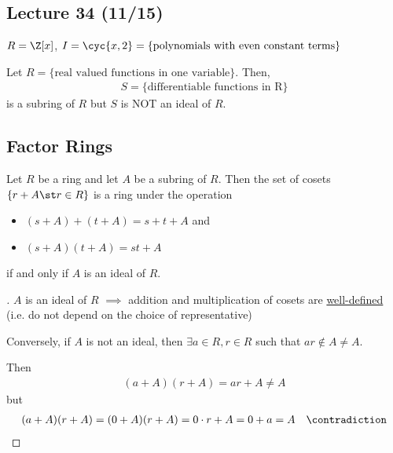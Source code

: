 
\subsection*{Lecture 34 (11/15)} %

\begin{example}
  \( R = \Z[x] \), \( I=\cyc{x,2}=\{\text{polynomials with even constant terms}\} \)
\end{example}

\begin{nonexample}
  Let \( R=\{\text{real valued functions in one variable}\} \). Then,
  \begin{align*}
    S=\{\text{differentiable functions in R}\}
  \end{align*}
  is a subring of \( R \) but \( S \) is NOT an ideal of \( R \).
\end{nonexample}

\subsection{Factor Rings}

\begin{theorem}
  Let \( R \) be a ring and let \( A \) be a subring of \( R \). Then the set of cosets \( \{r+A\st r\in R\} \)  is a ring under the operation
  \begin{itemize}
    \item \( (s+A)+(t+A) = s+t+A \) and
    \item \( (s+A)(t+A) = st+A\)
  \end{itemize}
  if and only if \( A \) is an ideal of \( R \).
\end{theorem}

\begin{proof}[]
  \( A \) is an ideal of \( R \) \( \implies \) addition and multiplication of cosets are \ul{well-defined} (i.e. do not depend on the choice of representative)

  Conversely, if \( A \) is not an ideal, then \( \exists a\in R, r\in R \) such that \( ar\not\in A \neq A \).

  Then
  \begin{align*}
    (a+A)(r+A) = ar+A\neq A
  \end{align*}
  but
  \begin{align*}
    (a+A)(r+A)=(0+A)(r+A) =0\cdot r+A=0+a=A \quad \contradiction
  \end{align*}
\end{proof}

